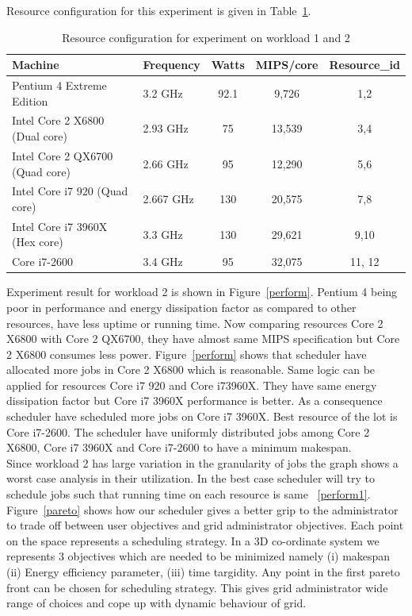 Resource configuration for this experiment is given in Table~\ref{tab:res}.
\begin{table}[ht]
\caption{Resource configuration for experiment on workload 1 and 2 }
\centering
    \begin{tabular}{|l|l|c|c|c|}
    \hline \hline
    Machine & Frequency & Watts & MIPS/core & Resource\_id \\ \hline
Pentium 4 Extreme Edition 	&	3.2 GHz 	&	92.1	& 	9,726	 & 1,2 \\ \hline
Intel Core 2  X6800 (Dual core) 	&	2.93 GHz	&	75	&	13,539	& 3,4 \\ \hline
Intel Core 2  QX6700 (Quad core) 	&	2.66 GHz 	&	95	&	12,290 & 5,6	 \\ \hline
Intel Core i7 920 (Quad core) 	&	2.667 GHz 	&	130	&	20,575	 & 7,8 \\ \hline
Intel Core i7 3960X (Hex core) 	&	3.3 GHz	&	130	&	29,621	& 9,10  \\ \hline
Core i7-2600 	&	3.4 GHz	&	95	&	32,075	 & 11, 12 \\ \hline
\end{tabular}
\label{tab:res}
\end{table}
Experiment result for workload 2 is shown in Figure~\ref{perform}. Pentium 4 being poor in performance and energy dissipation factor as compared to other resources, have less uptime or running time. Now comparing resources Core 2 X6800 with Core 2 QX6700, they have almost same MIPS specification but Core 2 X6800 consumes less power. Figure~\ref{perform} shows that scheduler have allocated more jobs in Core 2 X6800 which is reasonable. Same logic can be applied for resources Core i7 920 and Core i73960X. They have same energy dissipation factor but Core i7 3960X performance is better. As a consequence scheduler have scheduled more jobs on Core i7 3960X. Best resource of the lot is Core i7-2600. The scheduler have uniformly distributed jobs among Core 2 X6800, Core i7 3960X and Core i7-2600 to have a minimum makespan.\\
Since workload 2 has large variation in the granularity of jobs the graph shows a worst case analysis in their utilization. In the best case scheduler will try to schedule jobs such that running time on each resource is same ~\ref{perform1}. \\
Figure~\ref{pareto} shows how our scheduler gives a better grip to the administrator to trade off between user objectives and grid administrator objectives. Each point on the space represents a scheduling strategy. In a 3D co-ordinate system we represents 3 objectives which are needed to be minimized namely (i) makespan (ii) Energy efficiency parameter, (iii) time targidity. Any point in the first pareto front can be chosen for scheduling strategy. This gives grid administrator wide range of choices and cope up with dynamic behaviour of grid.

